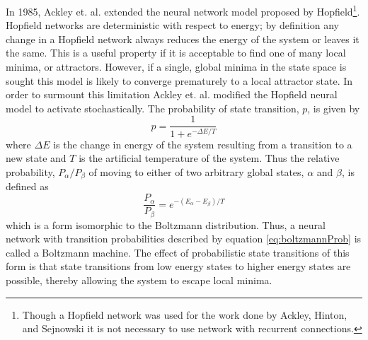 \documentclass[11pt]{afthesis}
\begin{document}
	In 1985, Ackley et. al. extended the neural network model proposed by Hopfield\footnote{Though a Hopfield network was used for the work done by Ackley, Hinton, and Sejnowski it is not necessary to use network with recurrent connections.}. Hopfield networks are deterministic with respect to energy; by definition any change in a Hopfield network always reduces the energy of the system or leaves it the same. This is a useful property if it is acceptable to find one of many local minima, or attractors. However, if a single, global minima in the state space is sought this model is likely to converge prematurely to a local attractor state. In order to surmount this limitation Ackley et. al. modified the Hopfield neural model to activate stochastically. The probability of state transition, \begin{math}p\end{math}, is given by \begin{equation} \label{eq:boltzmannProb}
	p= \frac{1}{1 + e^{- \Delta E  / T} }
	\end{equation} where \begin{math} \Delta E \end{math} is the change in energy of the system resulting from a transition to a new state and \begin{math}T\end{math} is the artificial temperature of the system. Thus the relative probability, \begin{math}P_{\alpha}/P_{\beta}\end{math} of moving to either of two arbitrary global states, \begin{math}\alpha\end{math} and \begin{math}\beta\end{math}, is defined as \begin{equation} \label{eq:boltzmannDist}
	\frac{P_{\alpha}}{P_{\beta}} =  e^{- (E_{\alpha} - E_{\beta} ) / T} 
	\end{equation} which is a form isomorphic to the Boltzmann distribution. Thus, a neural network with transition probabilities described by equation \ref{eq:boltzmannProb} is called a Boltzmann machine. The effect of probabilistic state transitions of this form is that state transitions from low energy states to higher energy states are possible, thereby allowing the system to escape local minima. 
	
\end{document}
